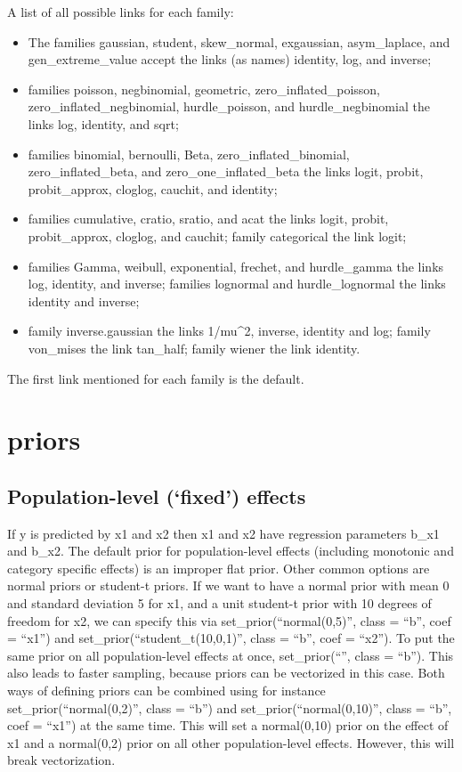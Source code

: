 \documentclass[]{book}
\begin{document}
A list of all possible links for each family:

\begin{itemize}
\item
  The families gaussian, student, skew\_normal, exgaussian, asym\_laplace, and gen\_extreme\_value accept the links (as names) identity, log, and inverse;
\item
  families poisson, negbinomial, geometric, zero\_inflated\_poisson, zero\_inflated\_negbinomial, hurdle\_poisson, and hurdle\_negbinomial the links log, identity, and sqrt;
\item
  families binomial, bernoulli, Beta, zero\_inflated\_binomial, zero\_inflated\_beta, and zero\_one\_inflated\_beta the links logit, probit, probit\_approx, cloglog, cauchit, and identity;
\item
  families cumulative, cratio, sratio, and acat the links logit, probit, probit\_approx, cloglog, and cauchit; family categorical the link logit;
\item
  families Gamma, weibull, exponential, frechet, and hurdle\_gamma the links log, identity, and inverse; families lognormal and hurdle\_lognormal the links identity and inverse;
\item
  family inverse.gaussian the links 1/mu\^{}2, inverse, identity and log; family von\_mises the link tan\_half; family wiener the link identity.
\end{itemize}

The first link mentioned for each family is the default.

\hypertarget{priors}{%
\section{priors}\label{priors}}

\hypertarget{population-level-fixed-effects}{%
\subsection{Population-level (`fixed') effects}\label{population-level-fixed-effects}}

If y is predicted by x1 and x2 then x1 and x2 have regression parameters b\_x1 and b\_x2. The default prior for population-level effects (including monotonic and category specific effects) is an improper flat prior. Other common options are normal priors or student-t priors. If we want to have a normal prior with mean 0 and standard deviation 5 for x1, and a unit student-t prior with 10 degrees of freedom for x2, we can specify this via set\_prior(``normal(0,5)'', class = ``b'', coef = ``x1'') and set\_prior(``student\_t(10,0,1)'', class = ``b'', coef = ``x2''). To put the same prior on all population-level effects at once, set\_prior(``'', class = ``b''). This also leads to faster sampling, because priors can be vectorized in this case. Both ways of defining priors can be combined using for instance set\_prior(``normal(0,2)'', class = ``b'') and
set\_prior(``normal(0,10)'', class = ``b'', coef = ``x1'') at the same time. This will set a normal(0,10) prior on the effect of x1 and a normal(0,2) prior on all other population-level effects. However, this will break vectorization.
\end{document}
